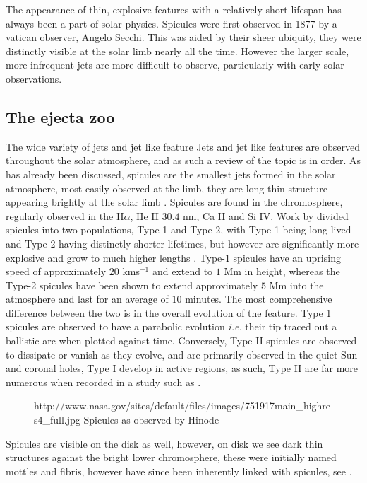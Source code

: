 The appearance of thin, explosive features with a relatively short lifespan has always been a part of solar physics.
Spicules were first observed in 1877 by a vatican observer, Angelo Secchi.
This was aided by their sheer ubiquity, they were distinctly visible at the solar limb nearly all the time.
However the larger scale, more infrequent jets are more difficult to observe, particularly with early solar observations.

\subsection{The ejecta zoo}

The wide variety of jets and jet like feature 
Jets and jet like features are observed throughout the solar atmosphere, and as such a review of the topic is in order.
As has already been discussed, spicules are the smallest jets formed in the solar atmosphere, 
most easily observed at the limb, they are long thin structure appearing brightly at the solar limb \citep{Beckers1972}.
Spicules are found in the chromosphere, regularly observed in the H$\alpha$, He II $30.4$ nm, Ca II and Si IV.
Work by \cite{DePontieu} divided spicules into two populations, Type-1 and Type-2, with Type-1 being long lived and Type-2 having distinctly shorter lifetimes, but however are significantly more explosive and grow to much higher lengths .
Type-1 spicules have an uprising speed of approximately $20$ kms$^{-1}$ and extend to $1$ Mm in height, whereas the Type-2 spicules have been shown to extend approximately $5$ Mm into the atmosphere and last for an average of $10$ minutes.
The most comprehensive difference between the two is in the overall evolution of the feature.
Type 1 spicules are observed to have a parabolic evolution \emph{i.e.} their tip traced out a ballistic arc when plotted against time.
Conversely, Type II spicules are observed to dissipate or vanish as they evolve, and are primarily observed in the quiet Sun and coronal holes, Type I develop in active regions, as such, Type II are far more numerous when recorded in a study such as \cite{Pereira2012}.

\begin{figure}
	\caption{http://www.nasa.gov/sites/default/files/images/751917main_highres4_full.jpg Spicules as observed by Hinode}
\end{figure}

Spicules are visible on the disk as well, however, on disk we see dark thin structures against the bright lower chromosphere, these were initially named mottles and fibris, however have since been inherently linked with spicules, see \cite{DePointeu2007MF}.

